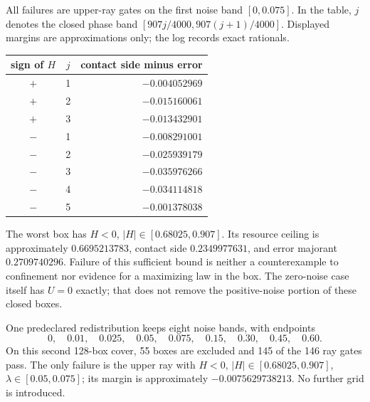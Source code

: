 \documentclass[11pt]{article}
\begin{document}
All failures are upper-ray gates on the first noise band $[0,0.075]$.
In the table, $j$ denotes the closed phase band
$[907j/4000,907(j+1)/4000]$. Displayed margins are approximations only;
the log records exact rationals.
\begin{center}
\begin{tabular}{ccr}\toprule
sign of $H$&$j$&contact side minus error\\\midrule
$+$&1&$-0.004052969$\\
$+$&2&$-0.015160061$\\
$+$&3&$-0.013432901$\\
$-$&1&$-0.008291001$\\
$-$&2&$-0.025939179$\\
$-$&3&$-0.035976266$\\
$-$&4&$-0.034114818$\\
$-$&5&$-0.001378038$\\\bottomrule
\end{tabular}
\end{center}
The worst box has $H<0$, $|H|\in[0.68025,0.907]$. Its resource ceiling
is approximately $0.6695213783$, contact side $0.2349977631$, and error
majorant $0.2709740296$. Failure of this sufficient bound is neither a
counterexample to confinement nor evidence for a maximizing law in the box.
The zero-noise case itself has $U=0$ exactly; that does not remove the
positive-noise portion of these closed boxes.

One predeclared redistribution keeps eight noise bands, with endpoints
\[
 0,\quad0.01,\quad0.025,\quad0.05,\quad0.075,\quad
 0.15,\quad0.30,\quad0.45,\quad0.60.
\]
On this second 128-box cover, 55 boxes are excluded and 145 of the
146 ray gates pass. The only failure is the upper ray with $H<0$,
$|H|\in[0.68025,0.907]$, $\lambda\in[0.05,0.075]$; its margin is
approximately $-0.0075629738213$. No further grid is introduced.
\end{document}

